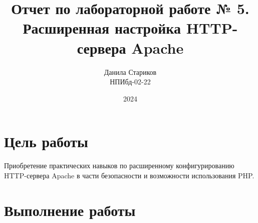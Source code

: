 

\title{Отчет по лабораторной работе № 5. \\Расширенная настройка HTTP-сервера Apache }
\author{Данила Стариков \\ НПИбд-02-22}
\date{2024}



\maketitle
\newpage

\tableofcontents

\newpage
\section{Цель работы}
Приобретение практических навыков по расширенному конфигурированию HTTP-сервера Apache в части безопасности и возможности использования PHP.
\newpage
\section{Выполнение работы}
